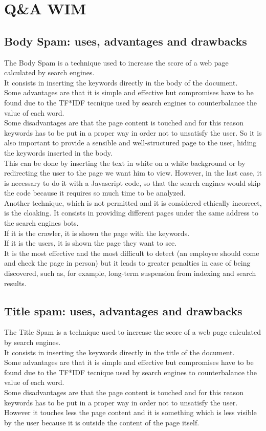 \section{Q\&A WIM}
\subsection{Body Spam: uses, advantages and drawbacks}
The Body Spam is a technique used to increase
the score of a web page calculated by search
engines.\\
It consists in inserting the keywords directly
in the body of the document.\\
Some advantages are that it is simple and effective
but compromises have to be found due to the TF*IDF
tecnique used by search engines to counterbalance the value of each word.
\\
Some disadvantages are that the page content is touched and for this reason
keywords has to be put in a proper way in order not to unsatisfy
the user.
So it is also important to provide a sensible
and well-structured page to the user, hiding the keywords inserted
in the body.\\
This can be done by inserting the text in white on a
white background or by redirecting the user to
the page we want him to view. However, in the last case, it is necessary
to do it with a Javascript code, so that the search engines would
skip the code because it requires so much time to be analyzed.\\
Another technique, which is not permitted and it is considered
ethically incorrect, is the cloaking.
It consists in providing different pages under the same address to the
search engines bots.\\
If it is the crawler, it is shown the page with the keywords.\\
If it is the users, it is shown the page they want to see.\\
It is the most effective and the most difficult to detect
(an employee should come and check the page in person)
but it leads to greater penalties in
case of being discovered, such as, for example, long-term
suspension from indexing and search results.

\subsection{Title spam: uses, advantages and drawbacks}
The Title Spam is a technique used to increase
the score of a web page calculated by search
engines.\\
It consists in inserting the keywords directly
in the title of the document.\\
Some advantages are that it is simple and effective
but compromises have to be found due to the TF*IDF
tecnique used by search engines to counterbalance the value of each
word.\\ Some disadvantages are that the page content is touched and for this reason
keywords has to be put in a proper way in order not to unsatisfy
the user. However it touches less the page content and it is something
which is less visible by the user because it is outside the content
of the page itself.

